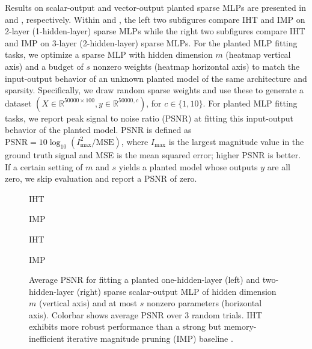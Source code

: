 \documentclass{article} %
\newcommand{\measurement}{y}
\newcommand{\m}{\ensuremath{m}}
\newcommand{\outputdim}{\ensuremath{c}}
\newcommand{\X}{\ensuremath{X}}
\newcommand{\1}{\ensuremath{{\sf (i)}}}
\newcommand{\2}{\ensuremath{{\sf (ii)}}}
\newcommand{\3}{\ensuremath{{\sf (iii)}}}
\newcommand{\4}{\ensuremath{{\sf (iv)}}}
\newcommand{\5}{\ensuremath{{\sf (v)}}}
\newcommand{\6}{\ensuremath{{\sf (vi)}}}
\newcommand{\R}{\mathbb{R}}
\begin{document}
Results on scalar-output and vector-output planted sparse MLPs are presented in  and , respectively.
Within  and , the left two subfigures compare IHT and IMP on 2-layer (1-hidden-layer) sparse MLPs while the right two subfigures compare IHT and IMP on 3-layer (2-hidden-layer) sparse MLPs.
For the planted MLP fitting tasks, we optimize a sparse MLP with hidden dimension $\m$ (heatmap vertical axis) and a budget of $s$ nonzero weights (heatmap horizontal axis) to match the input-output behavior of an unknown planted model of the same architecture and sparsity. Specifically, we draw random sparse weights and use these to generate a dataset $(\X \in \R^{50000 \times 100}, \measurement \in \R^{50000, \outputdim})$, for $\outputdim \in \{1, 10\}$. For planted MLP fitting tasks, we report peak signal to noise ratio (PSNR) at fitting this input-output behavior of the planted model. PSNR is defined as $\text{PSNR}=10\log_{10}(I^2_\text{max}/\text{MSE})$, where $I_\text{max}$ is the largest magnitude value in the ground truth signal and MSE is the mean squared error; higher PSNR is better.
If a certain setting of $\m$ and $s$ yields a planted model whose outputs $\measurement$ are all zero, we skip evaluation and report a PSNR of zero.






\begin{figure}[ht]
    \centering
    \begin{minipage}{0.24\textwidth}
    \centering
    IHT
    \end{minipage}
    \begin{minipage}{0.24\textwidth}
    \centering
        IMP
    \end{minipage}
    \centering
    \begin{minipage}{0.24\textwidth}
    \centering
    IHT
    \end{minipage}
    \begin{minipage}{0.24\textwidth}
    \centering
        IMP
    \end{minipage}
    \caption{Average PSNR for fitting a planted one-hidden-layer (left) and two-hidden-layer (right) sparse scalar-output MLP of hidden dimension $m$ (vertical axis) and at most $s$ nonzero parameters (horizontal axis). Colorbar shows average PSNR over 3 random trials. IHT exhibits more robust performance than a strong but memory-inefficient iterative magnitude pruning (IMP) baseline \citep{frankle2018lottery}.}
    \label{fig:planted_scalaroutput}
\end{figure}
\end{document}
